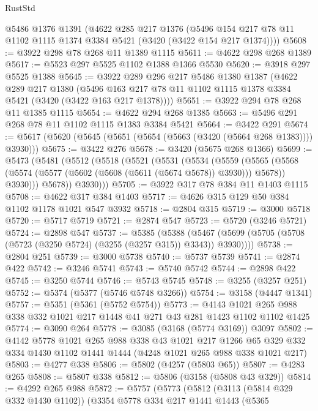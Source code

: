 \begin{lexlean}{RustStd}
\begin{coremodule}
{\begin{coremodule}
{{{{{{{{{{{{{{{{{{{{{{{{{{    @5486
    @1376
    @1391
    (@4622
      @285
      @217
      @1376
      (@5496 @154 @217 @78 @11 @1102 @1115 @1374 @3384 @5421 (@3420 (@3422 @154 @217 @1374))))
@5608 := @3922 @298 @78 @268 @11 @1389 @1115
@5611 := @4622 @298 @268 @1389
@5617 := @5523 @297 @5525 @1102 @1388 @1366 @5530
@5620 := @3918 @297 @5525 @1388
@5645 := @3922
    @289
    @296
    @217
    @5486
    @1380
    @1387
    (@4622
      @289
      @217
      @1380
      (@5496 @163 @217 @78 @11 @1102 @1115 @1378 @3384 @5421 (@3420 (@3422 @163 @217 @1378))))
@5651 := @3922 @294 @78 @268 @11 @1385 @1115
@5654 := @4622 @294 @268 @1385
@5663 := @5496 @291 @268 @78 @11 @1102 @1115 @1383 @3384 @5421
@5664 := @3422 @291
@5674 := @5617 (@5620 (@5645 (@5651 (@5654 (@5663 (@3420 (@5664 @268 @1383)))) @3930)))
@5675 := @3422 @276
@5678 := @3420 (@5675 @268 @1366)
@5699 := @5473
    (@5481
      (@5512
        (@5518
          (@5521
            (@5531
              (@5534
                (@5559
                  (@5565
                    (@5568 (@5574 (@5577 (@5602 (@5608 (@5611 (@5674 @5678)) @3930))) @5678))
                    @3930)))
              @5678))
          @3930)))
@5705 := @3922 @317 @78 @384 @11 @1403 @1115
@5708 := @4622 @317 @384 @1403
@5717 := @4626 @315 @129 @50 @384 @1102 @1178 @1021 @547 @3932
@5718 := @2804 @315
@5719 := @3000 @5718
@5720 := @5717 @5719
@5721 := @2874 @547
@5723 := @5720 (@3246 @5721)
@5724 := @2898 @547
@5737 := @5385
    (@5388 (@5467 (@5699 (@5705 (@5708 (@5723 (@3250 @5724) (@3255 (@3257 @315)) @3343)) @3930))))
@5738 := @2804 @251
@5739 := @3000 @5738
@5740 := @5737 @5739
@5741 := @2874 @422
@5742 := @3246 @5741
@5743 := @5740 @5742
@5744 := @2898 @422
@5745 := @3250 @5744
@5746 := @5743 @5745
@5748 := @3255 (@3257 @251)
@5752 := @5374 (@5377 (@5746 @5748 @3266))
@5754 := @3158 (@4447 @1341)
@5757 := @5351 (@5361 (@5752 @5754))
@5773 := @4143 @1021 @265 @988 @338 @332 @1021 @217 @1448 @41 @271 @43 @281 @1423 @1102 @1102 @1425
@5774 := @3090 @264
@5778 := @3085 (@3168 (@5774 @3169)) @3097
@5802 := @4142
    @5778
    @1021
    @265
    @988
    @338
    @43
    @1021
    @217
    @1266
    @65
    @329
    @332
    @334
    @1430
    @1102
    @1441
    @1444
    (@4248 @1021 @265 @988 @338 @1021 @217)
@5803 := @4277 @338
@5806 := @5802 (@4257 (@5803 @65))
@5807 := @4283 @265
@5808 := @5807 @338
@5812 := @5806 (@3158 (@5808 @43 @329))
@5814 := @4292 @265 @988
@5872 := @5757
    (@5773
      (@5812
        (@3113 (@5814 @329 @332 @1430 @1102))
        (@3354
          @5778
          @334
          @217
          @1441
          @1443
          (@5365
}}}}}}}}}}}}}}}}}}}}}}}}}}
\end{coremodule}}
\end{coremodule}
\end{lexlean}
